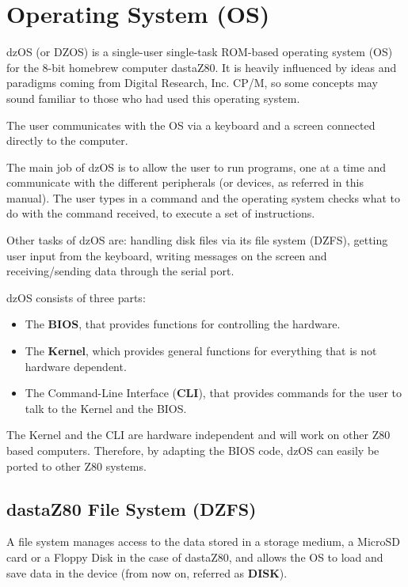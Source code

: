 \section{Operating System (OS)}
dzOS (or DZOS) is a single-user single-task ROM-based operating system (OS)
for the 8-bit homebrew computer dastaZ80. It is heavily influenced by ideas
and paradigms coming from Digital Research, Inc. CP/M, so some concepts may
sound familiar to those who had used this operating system.

The user communicates with the OS via a keyboard and a screen connected
directly to the computer.

The main job of dzOS is to allow the user to run programs, one at a time and
communicate with the different peripherals (or devices, as referred in this
manual). The user types in a command and the operating system checks what to
do with the command received, to execute a set of instructions.

Other tasks of dzOS are: handling disk files via its file system (DZFS),
getting user input from the keyboard, writing messages on the screen and
receiving/sending data through the serial port.

dzOS consists of three parts:
\begin{itemize}
    \item The \textbf{BIOS}, that provides functions for controlling the
    hardware.
    \item The \textbf{Kernel}, which provides general functions for
    everything that is not hardware dependent.
    \item The Command-Line Interface (\textbf{CLI}), that provides commands
    for the user to talk to the Kernel and the BIOS.
\end{itemize}

The Kernel and the CLI are hardware independent and will work on other Z80
based computers. Therefore, by adapting the BIOS code, dzOS can easily be
ported to other Z80 systems.

    \subsection{dastaZ80 File System (DZFS)}
    A file system manages access to the data stored in a storage medium, a
    MicroSD card or a Floppy Disk in the case of dastaZ80, and allows the OS to
    load and save data in the device (from now on, referred as \textbf{DISK}).

